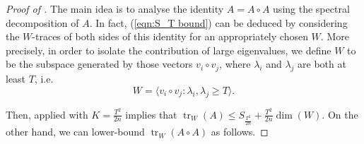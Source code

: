 \documentclass[11pt]{article}
\theoremstyle{plain}
\theoremstyle{definition}
\DeclareMathOperator{\trace}{tr}
\begin{document}
\begin{proof}[Proof of ]
The main idea is to analyse the identity $A=A\circ A$ using the spectral decomposition of $A$. In fact, (\ref{eqn:S_T bound}) can be deduced by considering the $W$-traces of both sides of this identity for an appropriately chosen $W$. 
More precisely, in order to isolate the contribution of large eigenvalues, we define $W$ to be the subspace generated by those vectors $v_i\circ v_j$, where $\lambda_i$ and $\lambda_j$ are both at least $T$, i.e. 
$$W=\langle v_i\circ v_j : \lambda_i,\lambda_j\geq T\rangle.$$

Then,  applied with $K=\frac{T^2}{2n}$ implies that $\trace_W(A)\leq S_{\frac{T^2}{2n}}+\frac{T^2}{2n}\dim(W)$. On the other hand, we can lower-bound $\trace_W(A\circ A)$ as follows.


\end{proof}
\end{document}
